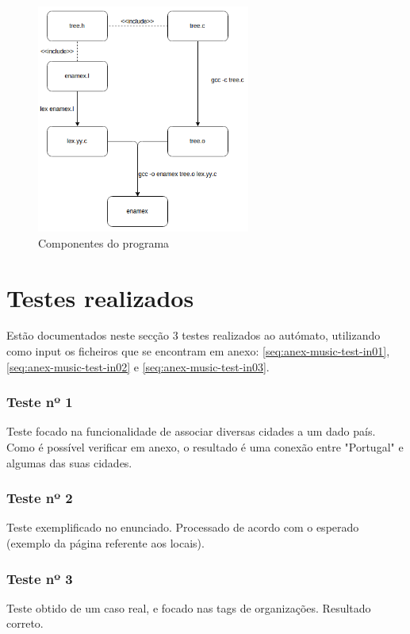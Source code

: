 \begin{figure}[H]
\centering
\includegraphics[width=7cm]{anexos/2-2/programa.png}
\caption{Componentes do programa}
\end{figure}
\section{Testes realizados}
\label{seq:enamex-test}
Estão documentados neste secção 3 testes realizados ao autómato, utilizando como input os ficheiros que se encontram em anexo: \ref{seq:anex-music-test-in01}, \ref{seq:anex-music-test-in02} e \ref{seq:anex-music-test-in03}.

\subsubsection{Teste nº 1}

Teste focado na funcionalidade de associar diversas cidades a um dado país. Como é possível verificar em anexo, o resultado é uma conexão entre "Portugal" e algumas das suas cidades.

\subsubsection{Teste nº 2}

Teste exemplificado no enunciado. Processado de acordo com o esperado (exemplo da página referente aos locais).

\subsubsection{Teste nº 3}

Teste obtido de um caso real, e focado nas tags de organizações. Resultado correto.



